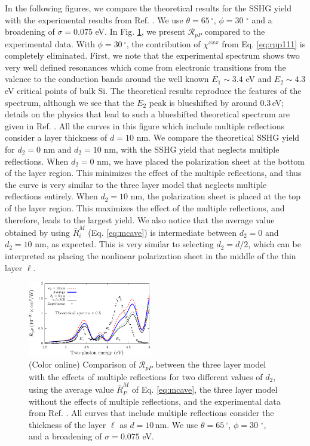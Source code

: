 \documentclass[aps,prb,10pt,showpacs,letterpaper,twocolumn]{revtex4-1}
\begin{document}
In the following figures, we compare the theoretical results for the SSHG yield
with the experimental results from Ref. . We use $\theta
= 65\,^{\circ}$, $\phi = 30\,\,^{\circ}$ and a broadening of $\sigma = 0.075$
eV. In Fig. \ref{fig:d2values}, we present $\mathcal{R}_{pP}$ compared to the
experimental data. With $\phi = 30\,^{\circ}$, the contribution of $\chi^{xxx}$
from Eq. \eqref{eq:rpp111} is completely eliminated. First, we note that the
experimental spectrum shows two very well defined resonances which come from
electronic transitions from the valence to the conduction bands around the well
known $E_{1}\sim 3.4$ eV and $E_{2}\sim 4.3$ eV critical points of bulk
Si.\cite{yubook} The theoretical results reproduce the features of the spectrum,
although we see that the $E_{2}$ peak is blueshifted by around 0.3\,eV; details
on the physics that lead to such a blueshifted theoretical spectrum are given in
Ref. . All the curves in this figure which include
multiple reflections consider a layer thickness of $d = 10$ nm. We compare the
theoretical SSHG yield for $d_{2} = 0$ nm and $d_{2} = 10$ nm, with the SSHG
yield that neglects multiple reflections. When $d_{2} = 0$ nm, we have placed
the polarization sheet at the bottom of the layer region. This minimizes the
effect of the multiple reflections, and thus the curve is very similar to the
three layer model that neglects multiple reflections entirely. When $d_{2} = 10$
nm, the polarization sheet is placed at the top of the layer region. This
maximizes the effect of the multiple reflections, and therefore, leads to the
largest yield. We also notice that the average value obtained by using
$\bar{R}^{M}_{i}$ (Eq. \eqref{eq:mcave}) is intermediate between $d_{2} = 0$ and
$d_{2} = 10$ nm, as expected. This is very similar to selecting $d_{2} = d/2$,
which can be interpreted as placing the nonlinear polarization sheet in the
middle of the thin layer $\ell$.

\begin{figure}[t]
\includegraphics[width=0.48\textwidth]{fig3}
\caption{(Color online) Comparison of $\mathcal{R}_{pP}$ between the three layer
model with the effects of multiple reflections for two different values of
$d_{2}$, using the average value $\bar{R}^{M}_P$ of Eq. \eqref{eq:mcave}, the
three layer model without the effects of multiple reflections, and the
experimental data from Ref. . All curves that include
multiple reflections consider the thickness of the layer $\ell$ as $d =
10\,\mathrm{nm}$. We use $\theta = 65\,^{\circ}$, $\phi = 30\,\,^{\circ}$, and a
broadening of $\sigma = 0.075$ eV.}
\label{fig:d2values}
\end{figure}
\end{document}
